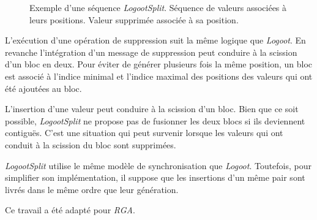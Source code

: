 \begin{figure}[tb]
\centering
\begin{subfigure}[b]{0.69\linewidth}
    \centering
    \caption{}\label{fig:logootsplit-1}
\end{subfigure}
\begin{subfigure}[b]{0.29\linewidth}
    \centering
    \caption{}\label{fig:logootsplit-2}
\end{subfigure}
\caption[Exemple d'une séquence \emph{LogootSplit}]{Exemple d'une séquence \emph{LogootSplit}.
 Séquence de valeurs associées à leurs positions.
 Valeur supprimée associée à sa position.}\label{fig:logootsplit}
\end{figure}

L'exécution d'une opération de suppression suit la même logique que \emph{Logoot}.
En revanche l'intégration d'un message de suppression peut conduire à la scission d'un bloc en deux.
Pour éviter de générer plusieurs fois la même position, un bloc est associé à l'indice minimal et l'indice maximal des positions des valeurs qui ont été ajoutées au bloc.

L'insertion d'une valeur peut conduire à la scission d'un bloc.
Bien que ce soit possible, \emph{LogootSplit} ne propose pas de fusionner les deux blocs si ils deviennent contiguës.
C'est une situation qui peut survenir lorsque les valeurs qui ont conduit à la scission du bloc sont supprimées.

\emph{LogootSplit} utilise le même modèle de synchronisation que \emph{Logoot}.
Toutefois, pour simplifier son implémentation, il suppose que les insertions d'un même pair sont livrés dans le même ordre que leur génération.

Ce travail a été adapté pour \emph{RGA}\autocite{briot_2016_rgasplit}.



